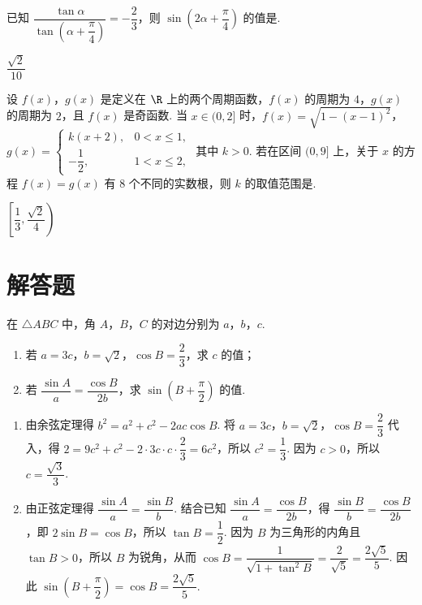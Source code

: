 \begin{problem}
已知 \(\dfrac{\tan\alpha}{\tan\left(\alpha+\dfrac{\pi}{4}\right)}=-\dfrac23\)，则 \(\sin\left(2\alpha+\dfrac{\pi}{4}\right)\) 的值是\fillinblank{}.

\begin{answer}
\(\dfrac{\sqrt{2}}{10}\)
\end{answer}
\end{problem}

\begin{problem}
设 \(f(x)\)，\(g(x)\) 是定义在 \(\R\) 上的两个周期函数，\(f(x)\) 的周期为 \(4\)，\(g(x)\) 的周期为 \(2\)，且 \(f(x)\) 是奇函数. 当 \(x\in(0,2]\) 时，\(f(x)=\sqrt{1-(x-1)^2}\)，\(g(x)=\begin{cases}
k(x+2),&0<x\le 1,\\
-\dfrac12,&1<x\le 2,
\end{cases}\) 其中 \(k>0\). 若在区间 \((0,9]\) 上，关于 \(x\) 的方程 \(f(x)=g(x)\) 有 \(8\) 个不同的实数根，则 \(k\) 的取值范围是\fillinblank{}.

\begin{answer}
\(\left[\dfrac{1}{3},\dfrac{\sqrt{2}}{4}\right)\)
\end{answer}
\end{problem}

\section{解答题}

\begin{problem}
在 \(\triangle ABC\) 中，角 \(A\)，\(B\)，\(C\) 的对边分别为 \(a\)，\(b\)，\(c\).

\begin{enumerate}
\item 若 \(a=3c\)，\(b=\sqrt2\)，\(\cos B=\dfrac23\)，求 \(c\) 的值；
\item 若 \(\dfrac{\sin A}{a}=\dfrac{\cos B}{2b}\)，求 \(\sin\left(B+\dfrac{\pi}{2}\right)\) 的值.
\end{enumerate}

\end{problem}

\begin{solution}
\begin{enumerate}
\item 由余弦定理得 \(b^2=a^2+c^2-2ac\cos B\). 将 \(a=3c\)，\(b=\sqrt2\)，\(\cos B=\dfrac23\) 代入，得 \(2=9c^2+c^2-2\cdot3c\cdot c\cdot\dfrac23=6c^2\)，所以 \(c^2=\dfrac13\). 因为 \(c>0\)，所以 \(c=\dfrac{\sqrt3}{3}\).
\item 由正弦定理得 \(\dfrac{\sin A}{a}=\dfrac{\sin B}{b}\). 结合已知 \(\dfrac{\sin A}{a}=\dfrac{\cos B}{2b}\)，得 \(\dfrac{\sin B}{b}=\dfrac{\cos B}{2b}\)，即 \(2\sin B=\cos B\)，所以 \(\tan B=\dfrac12\). 因为 \(B\) 为三角形的内角且 \(\tan B>0\)，所以 \(B\) 为锐角，从而 \(\cos B=\dfrac{1}{\sqrt{1+\tan^2B}}=\dfrac{2}{\sqrt5}=\dfrac{2\sqrt5}{5}\). 因此 \(\sin\left(B+\dfrac{\pi}{2}\right)=\cos B=\dfrac{2\sqrt5}{5}\).
\end{enumerate}
\end{solution}

